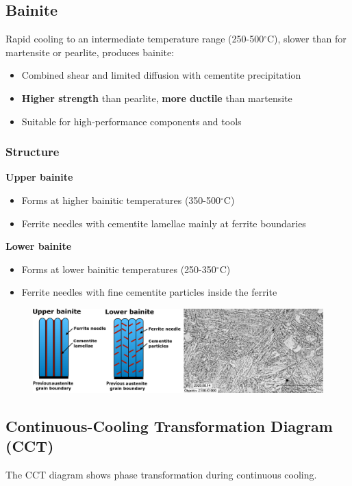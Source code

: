 \documentclass{article}
\begin{document}
\subsection{Bainite}
Rapid cooling to an intermediate temperature range (250-500$^\circ$C), slower than for martensite
or pearlite, produces bainite:
\begin{itemize}
  \item Combined shear and limited diffusion with cementite precipitation
  \item \textbf{Higher strength} than pearlite, \textbf{more ductile} than martensite
  \item Suitable for high-performance components and tools
\end{itemize}

\subsubsection{Structure}
\textbf{Upper bainite}
\begin{itemize}
  \item Forms at higher bainitic temperatures (350-500$^\circ$C)
  \item Ferrite needles with cementite lamellae mainly at ferrite boundaries
\end{itemize}

\textbf{Lower bainite}
\begin{itemize}
  \item Forms at lower bainitic temperatures (250-350$^\circ$C)
  \item Ferrite needles with fine cementite particles inside the ferrite
\end{itemize}

\begin{figure}[ht!]
  \centering
  \includegraphics[width=\textwidth]{media/bainite.png}
\end{figure}

\newpage
\subsection{Continuous-Cooling Transformation Diagram (CCT)}
The CCT diagram shows phase transformation during continuous cooling.
\end{document}
